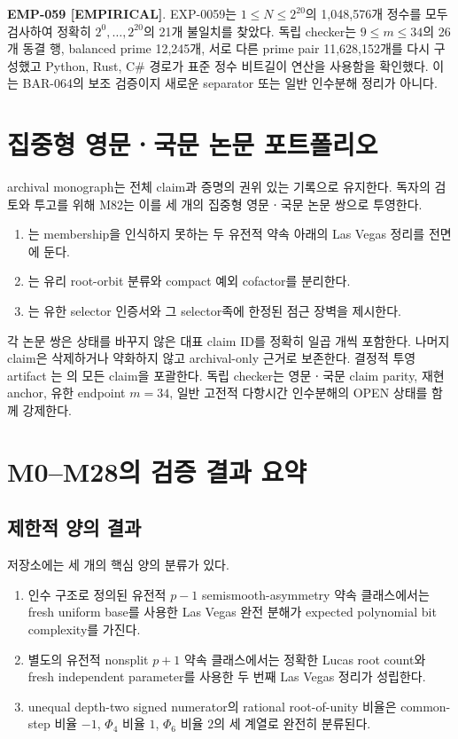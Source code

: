 \documentclass[11pt]{article}
\newcommand{\claimstatus}[2]{\textbf{#1 [#2]}}
\begin{document}
\claimstatus{EMP-059}{EMPIRICAL}. EXP-0059는
\(1\le N\le2^{20}\)의 1,048,576개 정수를 모두 검사하여 정확히
\(2^0,\ldots,2^{20}\)의 21개 불일치를 찾았다. 독립 checker는
\(9\le m\le34\)의 26개 동결 행, balanced prime 12,245개,
서로 다른 prime pair 11,628,152개를 다시 구성했고 Python, Rust,
C\# 경로가 표준 정수 비트길이 연산을 사용함을 확인했다. 이는
BAR-064의 보조 검증이지 새로운 separator 또는 일반 인수분해
정리가 아니다.

\section{집중형 영문ㆍ국문 논문 포트폴리오}

archival monograph는 전체 claim과 증명의 권위 있는 기록으로 유지한다.
독자의 검토와 투고를 위해 M82는 이를 세 개의 집중형 영문ㆍ국문 논문
쌍으로 투영한다.
\begin{enumerate}
\item {}는 membership을
  인식하지 못하는 두 유전적 약속 아래의 Las Vegas 정리를 전면에 둔다.
\item {}는 유리
  root-orbit 분류와 compact 예외 cofactor를 분리한다.
\item {}는 유한 selector
  인증서와 그 selector족에 한정된 점근 장벽을 제시한다.
\end{enumerate}
각 논문 쌍은 상태를 바꾸지 않은 대표 claim ID를 정확히 일곱 개씩
포함한다. 나머지 claim은 삭제하거나 약화하지 않고 archival-only
근거로 보존한다. 결정적 투영 artifact
는
의 모든 claim을 포괄한다. 독립 checker는
영문ㆍ국문 claim parity, 재현 anchor, 유한 endpoint \(m=34\), 일반
고전적 다항시간 인수분해의 OPEN 상태를 함께 강제한다.

\section{M0--M28의 검증 결과 요약}

\subsection{제한적 양의 결과}

저장소에는 세 개의 핵심 양의 분류가 있다.

\begin{enumerate}
\item 인수 구조로 정의된 유전적 \(p-1\) semismooth-asymmetry 약속
  클래스에서는 fresh uniform base를 사용한 Las Vegas 완전 분해가
  expected polynomial bit complexity를 가진다.
\item 별도의 유전적 nonsplit \(p+1\) 약속 클래스에서는 정확한 Lucas
  root count와 fresh independent parameter를 사용한 두 번째 Las Vegas
  정리가 성립한다.
\item unequal depth-two signed numerator의 rational root-of-unity 비율은
  common-step 비율 \(-1\), \(\Phi_4\) 비율 \(1\), \(\Phi_6\) 비율
  \(2\)의 세 계열로 완전히 분류된다.
\end{enumerate}
\end{document}
